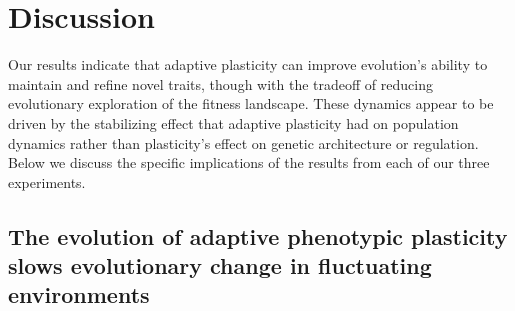 

\section{Discussion}

Our results indicate that adaptive plasticity can improve evolution's ability to maintain and refine novel traits, though with the tradeoff of reducing evolutionary exploration of the fitness landscape.
These dynamics appear to be driven by the stabilizing effect that adaptive plasticity had on population dynamics rather than plasticity's effect on genetic architecture or regulation.
Below we discuss the specific implications of the results from each of our three experiments.

\subsection{The evolution of adaptive phenotypic plasticity slows evolutionary change in fluctuating environments}

